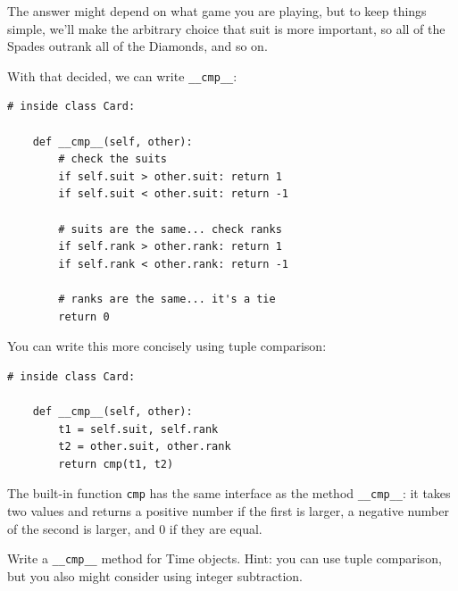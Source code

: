 \documentclass[10pt]{book}
\begin{document}
The answer might depend on what game you are playing, but to keep
things simple, we'll make the arbitrary choice that suit is more
important, so all of the Spades outrank all of the Diamonds,
and so on.


With that decided, we can write \verb"__cmp__":

\beforeverb
\begin{verbatim}
# inside class Card:

    def __cmp__(self, other):
        # check the suits
        if self.suit > other.suit: return 1
        if self.suit < other.suit: return -1

        # suits are the same... check ranks
        if self.rank > other.rank: return 1
        if self.rank < other.rank: return -1

        # ranks are the same... it's a tie
        return 0    
\end{verbatim}
\afterverb
%
You can write this more concisely using tuple comparison:


\beforeverb
\begin{verbatim}
# inside class Card:

    def __cmp__(self, other):
        t1 = self.suit, self.rank
        t2 = other.suit, other.rank
        return cmp(t1, t2)
\end{verbatim}
\afterverb
%
The built-in function {\tt cmp} has the same interface as
the method \verb"__cmp__": it takes two values and returns
a positive number if the first is larger, a negative number
of the second is larger, and 0 if they are equal.



\begin{ex}
Write a \verb"__cmp__" method for Time objects.  Hint: you
can use tuple comparison, but you also might consider using
integer subtraction.



\end{ex}
\end{document}
